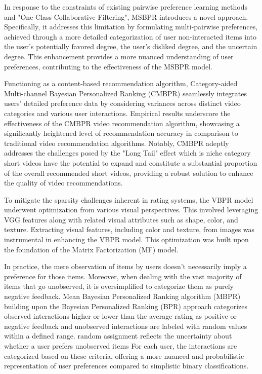 \documentclass[journal]{IEEEtran}
\begin{document}
In response to the constraints of existing pairwise preference learning methods and "One-Class Collaborative Filtering", 
MSBPR \cite{ZENG2023110165} introduces a 
novel approach. Specifically, it addresses this limitation by formulating multi-pairwise preferences, achieved through a 
more detailed categorization of user non-interacted items into the user's potentially favored degree, the user's disliked 
degree, and the uncertain degree. This enhancement provides a more nuanced understanding of user preferences, contributing 
to the effectiveness of the MSBPR model.

Functioning as a content-based recommendation algorithm, Category-aided Multi-channel Bayesian Personalized Ranking (CMBPR) \cite{8689028} 
seamlessly integrates users' detailed preference data by considering variances across distinct video categories and various user interactions. 
Empirical results underscore the effectiveness of the CMBPR video recommendation algorithm, showcasing a significantly heightened level of 
recommendation accuracy in comparison to traditional video recommendation algorithms. Notably, CMBPR adeptly addresses the challenges posed 
by the "Long Tail" effect which is niche category short videos have the potential to expand and constitute a substantial proportion 
of the overall recommended short videos, providing a robust solution to enhance the quality of video recommendations.

To mitigate the sparsity challenges inherent in rating systems, the VBPR model \cite{Liang2020497} underwent optimization from various visual 
perspectives. This involved leveraging VGG features along with related visual attributes such as shape, color, and texture. 
Extracting visual features, including color and texture, from images was instrumental in enhancing the VBPR model. This 
optimization was built upon the foundation of the Matrix Factorization (MF) model.

In practice, the mere observation of items by users doesn't necessarily imply a preference for those items. Moreover, when 
dealing with the vast majority of items that go unobserved, it is oversimplified to categorize them as purely negative feedback. 
Mean Bayesian Personalized Ranking algorithm (MBPR) \cite{8946325} building upon the Bayesian Personalized Ranking (BPR) approach
categorizes observed interactions higher or lower than the average rating as positive or negative feedback and unobserved interactions 
are labeled with random values within a defined range. random assignment reflects the uncertainty about whether a user prefers 
unobserved items For each user, the interactions are categorized based on these criteria, offering a more nuanced and probabilistic
representation of user preferences compared to simplistic binary classifications.
\end{document}

